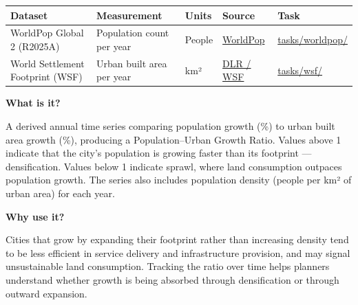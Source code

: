 \documentclass[
  letterpaper,
  DIV=11,
  numbers=noendperiod]{scrreprt}
\newcounter{none} %
\begin{document}
{\def\LTcaptype{none} %
\begin{longtable}[]{@{}
  >{\raggedright\arraybackslash}p{}
  >{\raggedright\arraybackslash}p{}
  >{\raggedright\arraybackslash}p{}
  >{\raggedright\arraybackslash}p{}
  >{\raggedright\arraybackslash}p{}@{}}
\toprule\noalign{}
\begin{minipage}[b]{\linewidth}\raggedright
Dataset
\end{minipage} & \begin{minipage}[b]{\linewidth}\raggedright
Measurement
\end{minipage} & \begin{minipage}[b]{\linewidth}\raggedright
Units
\end{minipage} & \begin{minipage}[b]{\linewidth}\raggedright
Source
\end{minipage} & \begin{minipage}[b]{\linewidth}\raggedright
Task
\end{minipage} \\
\midrule\noalign{}
\endhead
\bottomrule\noalign{}
\endlastfoot
WorldPop Global 2 (R2025A) & Population count per year & People &
\href{https://www.worldpop.org/}{WorldPop} &
\href{../tasks/worldpop/}{tasks/worldpop/} \\
World Settlement Footprint (WSF) & Urban built area per year & km² &
\href{https://www.dlr.de/eoc/en/desktopdefault.aspx/tabid-9334/16239_read-40144/}{DLR
/ WSF} & \href{../tasks/wsf/}{tasks/wsf/} \\
\end{longtable}
}

\textbf{What is it?}

A derived annual time series comparing population growth (\%) to urban
built area growth (\%), producing a Population--Urban Growth Ratio.
Values above 1 indicate that the city's population is growing faster
than its footprint --- densification. Values below 1 indicate sprawl,
where land consumption outpaces population growth. The series also
includes population density (people per km² of urban area) for each
year.

\textbf{Why use it?}

Cities that grow by expanding their footprint rather than increasing
density tend to be less efficient in service delivery and infrastructure
provision, and may signal unsustainable land consumption. Tracking the
ratio over time helps planners understand whether growth is being
absorbed through densification or through outward expansion.
\end{document}
